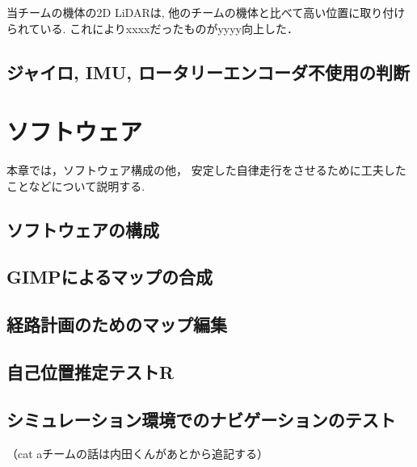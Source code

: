 \documentclass[twocolumn,9pt]{jsproceedings}
\begin{document}
当チームの機体の2D LiDARは, 他のチームの機体と比べて高い位置に取り付けられている.
\cite{RTshop}
これによりxxxxだったものがyyyy向上した．

\subsection{ジャイロ, IMU, ロータリーエンコーダ不使用の判断}


\section{ソフトウェア}

本章では，ソフトウェア構成の他，
安定した自律走行をさせるために工夫したことなどについて説明する.


\subsection{ソフトウェアの構成}

\subsection{GIMPによるマップの合成} %

\subsection{経路計画のためのマップ編集}


\subsection{自己位置推定テストR}

\subsection{シミュレーション環境でのナビゲーションのテスト}

（cat aチームの話は内田くんがあとから追記する）
\end{document}
